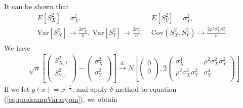 \documentclass[12pt, a4paper]{article}
\newcommand{\cov}{\text{Cov}}
\newcommand{\var}{\text{Var}}
\begin{document}
	It can be shown that 
		 \begin{equation}\label{eq:sampVarasypm}
		 \begin{aligned}
		 E[S_{X}^2] = \sigma_X^2,&~E[S_{Y}^2] = \sigma_Y^2,  \\
		 \var[S_{X}^2] \rightarrow \frac{2\sigma_X^4}{n},~\var[S_{Y}^2] \rightarrow \frac{2\sigma_Y^4}{n},&
		 ~\cov(S_{X}^2, S_{Y}^2) \rightarrow \frac{2\rho^2\sigma_X^2\sigma_Y^2}{n} \\
		 \end{aligned}
		 \end{equation} 
	We have 
		\begin{equation}\label{eq:poolsampVarasypm}
		\begin{aligned}
		& \sqrt{n}\left[\left( \begin{array}{c}
		S_{X, 1}^2\\
		S_{Y, 1}^2\\
		\end{array}\right)
		-
		\left( \begin{array}{c}
		\sigma_X^2\\
		\sigma_Y^2\\
		\end{array}\right)
		\right]
		\stackrel{d.}{\longrightarrow} 
		N\left[
		\left(\begin{array}{c}
		0\\
		0\\
		\end{array} \right), 
		2\left(
		\begin{array}{cc}
		\sigma_X^4 &\rho^2\sigma_X^2\sigma_Y^2 \\
		\rho^2\sigma_X^2\sigma_Y^2  &\sigma_Y^4 \\
		\end{array}
		\right)
		\right] 
		\end{aligned}
		\end{equation}
		If we let $g(x) = x^{-\frac{1}{2}}$, and apply $\delta$-method to equation (\ref{eq:poolsampVarasypm}), we obtain
\end{document}

